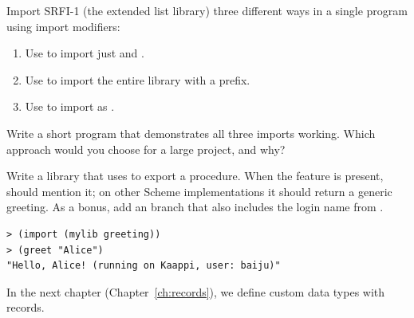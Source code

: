 \begin{exercise}
Import SRFI-1 (the extended list library) three different ways in a single program using import modifiers:

\begin{enumerate}
    \item Use  to import just  and .
    \item Use  to import the entire library with a  prefix.
    \item Use  to import  as .
\end{enumerate}

Write a short program that demonstrates all three imports working. Which approach would you choose for a large project, and why?
\end{exercise}

\begin{exercise}
Write a library  that uses  to export a  procedure. When the  feature is present,  should mention it; on other Scheme implementations it should return a generic greeting. As a bonus, add an  branch that also includes the login name from .

\begin{lstlisting}[style=repl]
> (import (mylib greeting))
> (greet "Alice")
"Hello, Alice! (running on Kaappi, user: baiju)"
\end{lstlisting}
\end{exercise}

In the next chapter (Chapter~\ref{ch:records}), we define custom data types with records.

\chapterend
